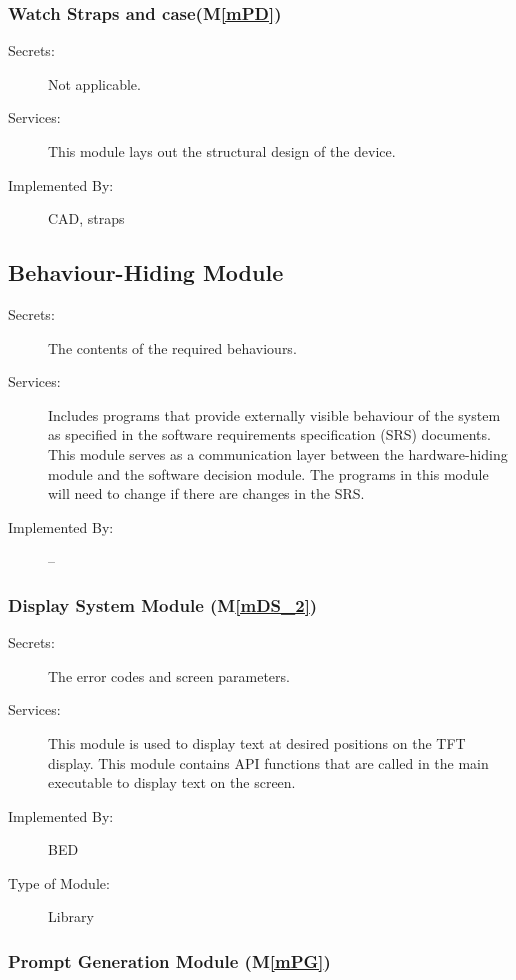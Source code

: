 \documentclass[12pt, titlepage]{article}
\newcommand{\mref}[1]{M\ref{#1}}
\begin{document}
\subsubsection{Watch Straps and case(\mref{mPD})}
\begin{description}
  \item[Secrets:] Not applicable.
  \item[Services:] This module lays out the structural design of the device.
  \item[Implemented By:] CAD, straps
\end{description}
\subsection{Behaviour-Hiding Module}

\begin{description}
  \item[Secrets:]The contents of the required behaviours.
  \item[Services:]Includes programs that provide externally visible behaviour of
  the system as specified in the software requirements specification (SRS)
  documents. This module serves as a communication layer between the
  hardware-hiding module and the software decision module. The programs in this
  module will need to change if there are changes in the SRS.
  \item[Implemented By:] --
\end{description}

\subsubsection{Display System Module (\mref{mDS_2}) }

\begin{description}
  \item[Secrets:]The error codes and screen parameters.
  \item[Services:] This module is used to display text at desired positions on the TFT display.
    This module contains API functions that are called in the main executable to display text on the screen.
  \item[Implemented By:] BED
  \item[Type of Module:] Library
\end{description}

\subsubsection{Prompt Generation Module (\mref{mPG})}
\end{document}
